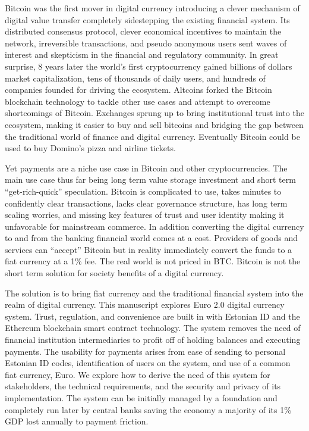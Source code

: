 \documentclass[12pt]{article} %
\begin{document}
Bitcoin was the first mover in digital currency introducing a clever mechanism of digital value transfer completely sidestepping the existing financial system. Its distributed consensus protocol, clever economical incentives to maintain the network, irreversible transactions, and pseudo anonymous users sent waves of interest and skepticism in the financial and regulatory community. In great surprise, 8 years later the world's first cryptocurrency gained billions of dollars market capitalization, tens of thousands of daily users, and hundreds of companies founded for driving the ecosystem. Altcoins forked the Bitcoin blockchain technology to tackle other use cases and attempt to overcome shortcomings of Bitcoin. Exchanges sprung up to bring institutional trust into the ecosystem, making it easier to buy and sell bitcoins and bridging the gap between the traditional world of finance and digital currency. Eventually Bitcoin could be used to buy Domino's pizza and airline tickets.

Yet payments are a niche use case in Bitcoin and other cryptocurrencies. The main use case thus far being long term value storage investment and short term ``get-rich-quick'' speculation. Bitcoin is complicated to use, takes minutes to confidently clear transactions, lacks clear governance structure, has long term scaling worries, and missing key features of trust and user identity making it unfavorable for mainstream commerce. In addition converting the digital currency to and from the banking financial world comes at a cost. Providers of goods and services can ``accept'' Bitcoin but in reality immediately convert the funds to a fiat currency at a 1\% fee. The real world is not priced in BTC. Bitcoin is not the short term solution for society benefits of a digital currency.

The solution is to bring fiat currency and the traditional financial system into the realm of digital currency. This manuscript explores Euro 2.0 digital currency system. Trust, regulation, and convenience are built in with Estonian ID and the Ethereum blockchain smart contract technology. The system removes the need of financial institution intermediaries to profit off of holding balances and executing payments. The usability for payments arises from ease of sending to personal Estonian ID codes, identification of users on the system, and use of a common fiat currency, Euro. We explore how to derive the need of this system for stakeholders, the technical requirements, and the security and privacy of its implementation. The system can be initially managed by a foundation and completely run later by central banks saving the economy a majority of its 1\% GDP lost annually to payment friction.
\end{document}
